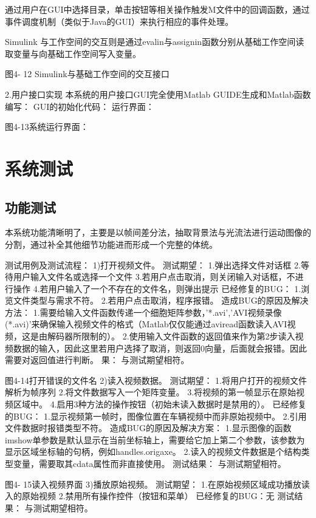 \documentclass[18pt, twoside, a4paper, dvipdfm]{book}
\begin{document}
 通过用户在GUI中选择目录，单击按钮等相关操作触发M文件中的回调函数，通过事件调度机制（类似于Java的GUI）来执行相应的事件处理。

Simulink 与工作空间的交互则是通过evalin与assignin函数分别从基础工作空间读取变量与向基础工作空间写入变量。

 

图4- 12 Simulink与基础工作空间的交互接口


2.用户接口实现
本系统的用户接口GUI完全使用Matlab GUIDE生成和Matlab函数编写：
GUI的初始化代码：
运行界面：
 

图4-13系统运行界面：

\section{系统测试}
\subsection{功能测试}
	本系统功能清晰明了，主要是以帧间差分法，抽取背景法与光流法进行运动图像的分割，通过补全其他细节功能进而形成一个完整的体统。

测试用例及测试流程：
1)打开视频文件。
测试期望：
1.弹出选择文件对话框
2.等待用户输入文件名或选择一个文件
3.若用户点击取消，则关闭输入对话框，不进行操作
4.若用户输入了一个不存在的文件名，则弹出提示
已经修复的BUG：
1.浏览文件类型与需求不符。
2.若用户点击取消，程序报错。
造成BUG的原因及解决方法：
1.需要给输入文件函数传递一个细胞矩阵参数，{'*.avi','AVI视频录像(*.avi)'}来确保输入视频文件的格式（Matlab仅仅能通过aviread函数读入AVI视频，这是由解码器所限制的）。
2.使用输入文件函数的返回值来作为第2步读入视频数据的输入，因此这里若用户选择了取消，则返回0向量，后面就会报错。因此需要对返回值进行判断。
果：
与测试期望相符。
 

图4-14打开错误的文件名
2)读入视频数据。
测试期望：
1.将用户打开的视频文件解析为帧序列
2.将文件数据写入一个矩阵变量。
3.将视频的第一帧显示在原始视频区域中。
4.启用3种方法的操作按钮（初始未读入数据时是禁用的）。
已经修复的BUG：
1.显示视频第一帧时，图像位置在车辆视频中而非原始视频中。
2.引用文件数据时报错类型不符。
造成BUG的原因及解决方案：
1.显示图像的函数imshow单参数是默认显示在当前坐标轴上，需要给它加上第二个参数，该参数为显示区域坐标轴的句柄，例如handles.origaxe。
2.读入的视频文件数据是个结构类型变量，需要取其cdata属性而非直接使用。
测试结果：
与测试期望相符。
 

图4- 15读入视频界面
3)播放原始视频。
测试期望：
1.在原始视频区域成功播放读入的原始视频
2.禁用所有操作控件（按钮和菜单）
已经修复的BUG：无
测试结果：
	与测试期望相符。
 
\end{document}
